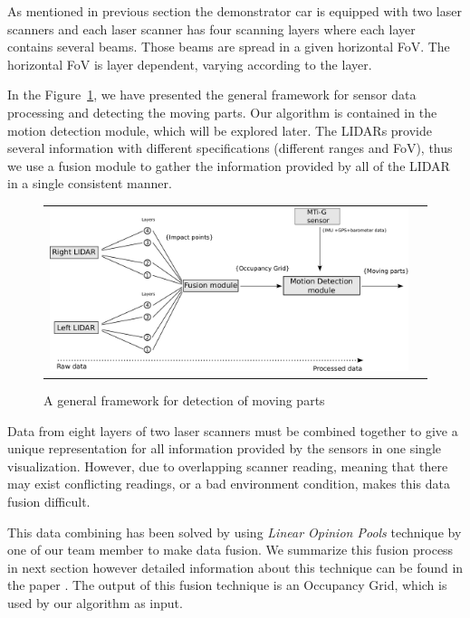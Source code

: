 As mentioned in previous section the demonstrator car is equipped with two laser scanners and each laser scanner has four scanning layers where each layer contains several beams. Those beams are spread in a given horizontal FoV. The horizontal FoV is layer dependent, varying according to the layer.

In the Figure~\ref{fig:motion:framework}, we have presented the general framework for sensor data processing and detecting the moving parts. Our algorithm is contained in the motion detection module, which will be explored later. The LIDARs provide several information with different specifications (different ranges and FoV), thus we use a fusion module to gather the information provided by all of the LIDAR in a single consistent manner.

\begin{figure}[H]
   \centering
     \begin{tabular}{lr}
       \includegraphics[scale=0.30]{img/fig:motion:framework}
     \end{tabular}
   \caption{A general framework for detection of moving parts}
   \label{fig:motion:framework}
\end{figure}

Data from eight layers of two laser scanners must be combined together to give a unique representation for all information provided by the sensors in one single visualization. However, due to  overlapping scanner reading, meaning that there may exist conflicting readings, or a bad environment condition, makes this data fusion difficult.

This data combining has been solved by using \textit{Linear Opinion Pools} technique  by one of our team member to make data fusion. We summarize this fusion process in next section however detailed information about this technique can be found in the paper \cite{ADARVE-2012-671211}. The output of this fusion technique is an Occupancy Grid, which is used by our algorithm as input.

